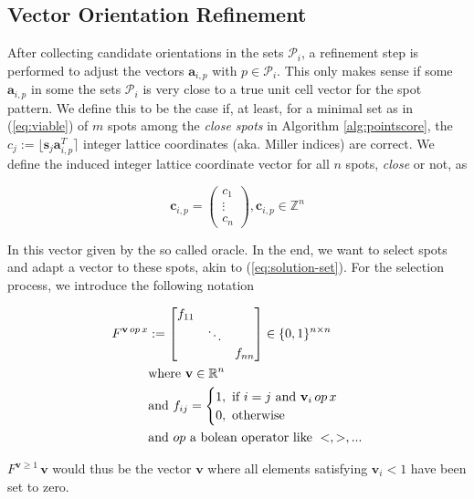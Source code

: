 \documentclass[a4paper,10pt]{article}
\newcommand{\vect}[1]{\mathbf{#1}}
\newcommand{\round}[1]{\lfloor #1 \rceil}
\newcommand{\filter}[1]{F^{#1}}
\begin{document}
\subsection{Vector Orientation Refinement}

After collecting candidate orientations in the sets $\mathcal{P}_i$, a refinement step is performed to adjust the vectors $\vect{a}_{i,p}$ with $p\in \mathcal{P}_i$. This only makes sense if some $\vect{a}_{i,p}$ in some the sets $\mathcal{P}_i$ is very close to a true unit cell vector for the spot pattern. We define this to be the case if, at least, for a minimal set as in (\ref{eq:viable}) of $m$ spots among the \emph{close spots} in Algorithm \ref{alg:pointscore}, the $c_j := \round{\vect{s}_j \vect{a}_{i,p}^T}$ integer lattice coordinates (aka. Miller indices) are correct. We define the induced integer lattice coordinate vector for all $n$ spots, \emph{close} or not, as

\[
\vect{c}_{i,p} = \begin{pmatrix} c_1 \\ \vdots \\ c_n \end{pmatrix}, \vect{c}_{i,p}\in \mathbb{Z}^{n}
\]

In \cite{toro-indexer} this vector given by the so called oracle. In the end, we want to select spots and adapt a vector to these spots, akin to (\ref{eq:solution-set}). For the selection process, we introduce the following notation

\begin{align}
\filter{\vect{v}\, op\, x} &:= \begin{bmatrix}
  f_{11} &        &        \\
         & \ddots &        \\
         &        & f_{nn}
\end{bmatrix} \in \{0,1\}^{n\times n} \\
&\text{where } \vect{v} \in \mathbb{R}^n \notag \\
&\text{and } f_{ij} = \begin{cases}
  1,\text{ if } i=j\text{ and }\vect{v}_i\, op\, x \\
  0,\text{ otherwise}
\end{cases}  \notag \\
&\text{and }op\text{ a bolean operator like } <, >, ... \notag
\end{align}

$\filter{\vect{v} \geq 1}\,\vect{v}$ would thus be the vector $\vect{v}$ where all elements satisfying $\vect{v}_i < 1$ have been set to zero.
\end{document}
